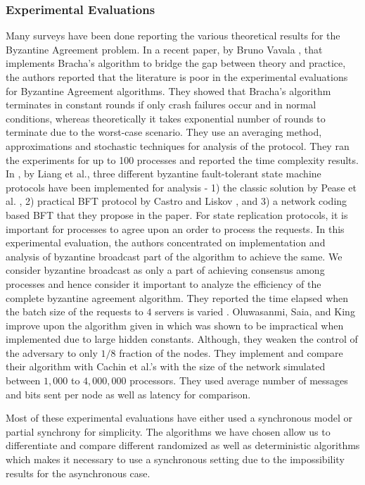 \subsubsection{Experimental Evaluations}
Many surveys have been done reporting the various theoretical results for the Byzantine Agreement problem. In a recent paper, by Bruno Vavala \cite{VN12}, that implements Bracha's algorithm \cite{Bracha84} to bridge the gap between theory and practice, the authors reported that the literature is poor in the experimental evaluations for Byzantine Agreement algorithms. They showed that Bracha's algorithm terminates in constant rounds if only crash failures occur and in normal conditions, whereas theoretically it takes exponential number of rounds to terminate due to the worst-case scenario. They use an averaging method, approximations and stochastic techniques for analysis of the protocol. They ran the experiments for up to 100 processes and reported the time complexity results. In \cite{LSV12}, by Liang et al., three different byzantine fault-tolerant state machine protocols have been implemented for analysis - 1) the classic solution by Pease et al. \cite{PeaseSL80}, 2) practical BFT protocol by Castro and Liskov \cite{CL02}, and 3) a network coding based BFT that they propose in the paper. For state replication protocols, it is important for processes to agree upon an order to process the requests. In this experimental evaluation, the authors concentrated on implementation and analysis of byzantine broadcast part of the algorithm to achieve the same. We consider byzantine broadcast as only a part of achieving consensus among processes and hence consider it important to analyze the efficiency of the complete byzantine agreement algorithm. They reported the time elapsed when the batch size of the requests to $4$ servers is varied . Oluwasanmi, Saia, and King \cite{OSK10} improve upon the algorithm given in \cite{KS09} which was shown to be impractical when implemented due to large hidden constants. Although, they weaken the control of the adversary to only $1/8$ fraction of the nodes. They implement and compare their algorithm with Cachin et al.'s \cite{CKS05} with the size of the network simulated between $1,000$ to $4,000,000$ processors. They used average number of messages and bits sent per node as well as latency for comparison.

Most of these experimental evaluations have either used a synchronous model or partial synchrony for simplicity. The algorithms we have chosen allow us to differentiate and compare different randomized as well as deterministic algorithms which makes it necessary to use a synchronous setting due to the impossibility results for the asynchronous case. 

